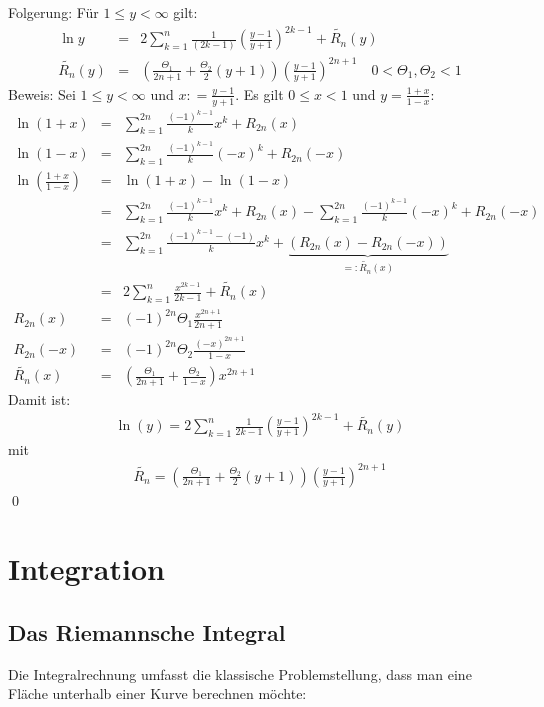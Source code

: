 \documentclass[ngerman,titlepage,twoside, parskip=half*]{scrreprt}
\theoremstyle{plain}
\theoremstyle{definition}
\theoremstyle{remark}
\newcommand*{\coloneqq}{\mathrel{\mathop:}=}
\begin{document}
Folgerung: Für $1\leq y<\infty$ gilt:
\begin{align*}
  \ln y &=& 2\sum_{k=1}^n \frac{1}{(2k-1)}\left( \frac{y-1}{y+1} \right)^{2k-1}
  +\widetilde{R_n}(y)\\
  \widetilde{R_n}(y) &=& \left( \frac{\Theta_1}{2n+1}+\frac{\Theta_2}{2}(y+1) \right)
  \left( \frac{y-1}{y+1} \right)^{2n+1}\quad 0<\Theta_1,\Theta_2<1
\end{align*}
Beweis: Sei $1\leq y <\infty$ und $x\coloneqq\frac{y-1}{y+1}$. Es gilt $0\leq x<1$
und $y=\frac{1+x}{1-x}$:
\begin{align*}
  \ln(1+x) &=& \sum_{k=1}^{2n}\frac{(-1)^{k-1}}{k}x^k+R_{2n}(x)\\
  \ln(1-x) &=& \sum_{k=1}^{2n}\frac{(-1)^{k-1}}{k}(-x)^k+R_{2n}(-x)\\
  \ln\left( \frac{1+x}{1-x} \right) &=& \ln(1+x)-\ln(1-x)\\
  &=& \sum_{k=1}^{2n}\frac{(-1)^{k-1}}{k}x^k+R_{2n}(x)-
  \sum_{k=1}^{2n}\frac{(-1)^{k-1}}{k}(-x)^k+R_{2n}(-x)\\
  &=& \sum_{k=1}^{2n}\frac{(-1)^{k-1}-(-1)}{k}x^k+
  \underbrace{(R_{2n}(x)-R_{2n}(-x))}_{=:\widetilde{R_n}(x)}\\
  &=& 2\sum_{k=1}^n\frac{x^{2k-1}}{2k-1}+\widetilde{R_n}(x)\\
  R_{2n}(x)&=& (-1)^{2n}\Theta_1\frac{x^{2n+1}}{2n+1}\\
  R_{2n}(-x)&=& (-1)^{2n}\Theta_2\frac{(-x)^{2n+1}}{1-x}\\
  \widetilde{R_n}(x)&=& \left( \frac{\Theta_1}{2n+1}+\frac{\Theta_2}{1-x} \right)
  x^{2n+1}
\end{align*}
Damit ist:
\begin{gather*}\boxed{\ln(y)=2\sum_{k=1}^n\frac{1}{2k-1}\left( \frac{y-1}{y+1} \right)^{2k-1}
+\widetilde{R_n}(y)}\end{gather*}
mit
\begin{gather*}\boxed{\widetilde{R_n}=\left( \frac{\Theta_1}{2n+1}+\frac{\Theta_2}{2}
(y+1)\right)\left( \frac{y-1}{y+1} \right)^{2n+1}}\end{gather*}
\qed

\chapter{Integration}
\section{Das Riemannsche Integral}
Die Integralrechnung umfasst die klassische Problemstellung, 
dass man eine Fläche unterhalb einer Kurve berechnen möchte:
\end{document}
